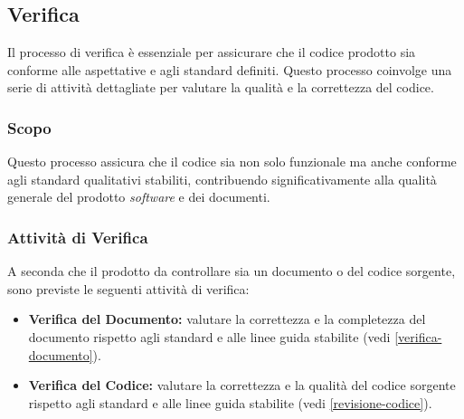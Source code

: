 \subsection{Verifica}

Il processo di verifica è essenziale per assicurare che il codice prodotto sia
conforme alle aspettative e agli standard definiti. Questo processo coinvolge
una serie di attività dettagliate per valutare la qualità e la correttezza del
codice.

\subsubsection{Scopo}
Questo processo assicura che il codice sia non solo funzionale ma anche
conforme agli standard qualitativi stabiliti, contribuendo significativamente
alla qualità generale del prodotto \textit{software} e dei documenti.

\subsubsection{Attività di Verifica}
A seconda che il prodotto da controllare sia un documento o del codice sorgente,
sono previste le seguenti attività di verifica:
\begin{itemize}
	\item \textbf{Verifica del Documento:} valutare la correttezza e la
	      completezza del documento rispetto agli standard e alle linee guida
	      stabilite (vedi \autoref{verifica-documento}).

	\item \textbf{Verifica del Codice:} valutare la correttezza e la qualità del
	      codice sorgente rispetto agli standard e alle linee guida stabilite
	      (vedi \autoref{revisione-codice}).
\end{itemize}
